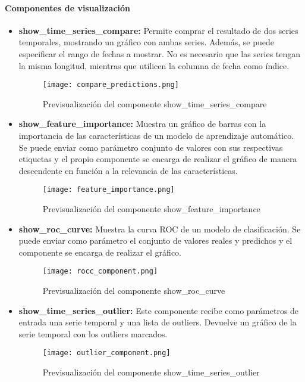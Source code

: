 \paragraph{Componentes de visualización}
\begin{itemize}
    \item \textbf{show\_time\_series\_compare:} Permite comprar el resultado de dos series temporales,
    mostrando un gráfico con ambas series. Además, se puede especificar el rango de fechas a mostrar.
    No es necesario que las series tengan la misma longitud, mientras que utilicen la columna de fecha
    como índice.
    \begin{figure}[ht]
        \centering
        \texttt{[image: compare\_predictions.png]}
        \caption{Previsualización del componente show\_time\_series\_compare}
        \label{fig:compare_predictions}
    \end{figure}
    \item \textbf{show\_feature\_importance:} Muestra un gráfico de barras con la importancia de las
    características de un modelo de aprendizaje automático. Se puede enviar como parámetro conjunto 
    de valores con sus respectivas etiquetas y el propio componente se encarga de realizar el gráfico
    de manera descendente en función a la relevancia de las características.
    \begin{figure}[ht]
        \centering
        \texttt{[image: feature\_importance.png]}
        \caption{Previsualización del componente show\_feature\_importance}
        \label{fig:feature_importance}
    \end{figure}
    \item \textbf{show\_roc\_curve:} Muestra la curva ROC de un modelo de clasificación. Se puede
    enviar como parámetro el conjunto de valores reales y predichos y el componente se encarga de
    realizar el gráfico.
    \begin{figure}[ht]
        \centering
        \texttt{[image: rocc\_component.png]}
        \caption{Previsualización del componente show\_roc\_curve}
        \label{fig:roc_curve}
    \end{figure}
    \item \textbf{show\_time\_series\_outlier:} Este componente recibe como parámetros de entrada
    una serie temporal y una lista de outliers. Devuelve un gráfico de la serie temporal con los
    outliers marcados. 
    \begin{figure}[!h]
        \centering
        \texttt{[image: outlier\_component.png]}
        \caption{Previsualización del componente show\_time\_series\_outlier}
        \label{fig:outlier_component}
    \end{figure}
\end{itemize}


